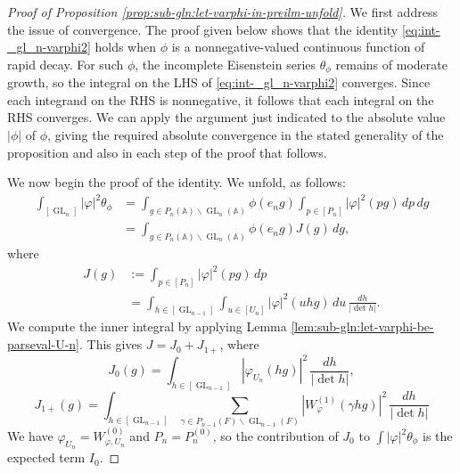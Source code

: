 \documentclass[reqno]{amsart}
\DeclareMathOperator{\GL}{GL}
\theoremstyle{plain} \newtheorem{theorem} {Theorem}
\theoremstyle{definition} \newtheorem{definition} [theorem] {Definition}
\theoremstyle{itplain} %
\numberwithin{equation}{section}
\numberwithin{theorem}{section}
\begin{document}
\begin{proof}[Proof of Proposition \ref{prop:sub-gln:let-varphi-in-preilm-unfold}]
  We first address the issue of convergence.  The proof given below shows that the identity \eqref{eq:int-_gl_n-varphi2} holds when $\phi$ is a nonnegative-valued continuous function of rapid decay.  For such $\phi$, the incomplete Eisenstein series $\theta_\phi$ remains of moderate growth, so the integral on the LHS of \eqref{eq:int-_gl_n-varphi2} converges.  Since each integrand on the RHS is nonnegative, it follows that each integral on the RHS converges.  We can apply the argument just indicated to the absolute value $|\phi|$ of $\phi$, giving the required absolute convergence in the stated generality of the proposition and also in each step of the proof that follows.

  We now begin the proof of the identity.  We unfold, as follows:
  \begin{align*}
    \int _{[\GL_n]} |\varphi|^2 \theta_\phi
    &=
      \int _{g \in P_n(\mathbb{A}) \backslash \GL_n(\mathbb{A})}
      \phi(e_n g)
      \int _{p \in [P_n]} |\varphi|^2(p g) \, d p \, d g \\
    &=
      \int _{g \in P_n(\mathbb{A}) \backslash \GL_n(\mathbb{A})}
      \phi(e_n g)
      J(g) \, d g,
  \end{align*}
  where
  \begin{align*}
    J(g) &:=
           \int _{p \in [P_n]}
           |\varphi|^2( p g) \, d p \\
         &=
           \int _{h \in [\GL_{n-1}]}
           \int _{u \in [U_n]} |\varphi|^2(u h g) \, d u \, \frac{d h}{|\det h|}.
  \end{align*}
  We compute the inner integral by applying Lemma \ref{lem:sub-gln:let-varphi-be-parseval-U-n}.  This gives $J = J_{0} + J_{1+}$, where
  \begin{equation*}
    J_0(g) =
    \int _{h \in [\GL_{n-1}]} | \varphi_{U_n}(h g) |^2 \, \frac{d h}{|\det h|},
  \end{equation*}
  \begin{equation*}
    J_{1+}(g) =
    \int _{h \in [\GL_{n-1}]}
    \sum _{\gamma \in P_{n-1}(F) \backslash \GL_{n-1}(F)}
    |W_\varphi^{(1)}(\gamma h g)|^2 \, \frac{d h}{|\det h|}
  \end{equation*}
  We have $\varphi_{U_n} = W_{\varphi,U_n}^{(0)}$ and $P_n = P_n^{(0)}$, so the contribution of $J_0$ to $\int |\varphi|^2 \theta_\phi$ is the expected term $I_{0}$.


\end{proof}
\end{document}
